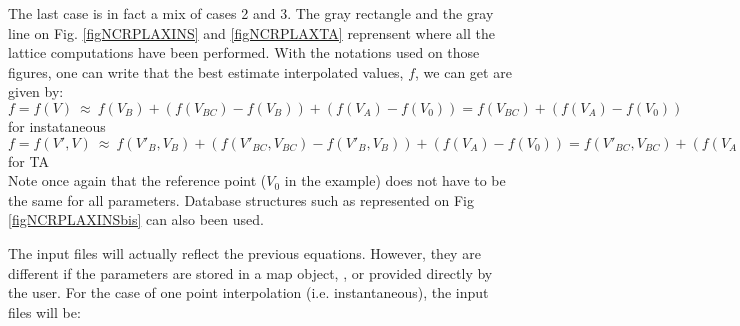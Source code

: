 The last case is in fact a mix of cases 2 and 3. The gray rectangle and the gray line on Fig. \ref{figNCRPLAXINS} and \ref{figNCRPLAXTA} reprensent where all the lattice computations have been performed. With the notations used on those figures, one can write that the best estimate interpolated values, $f$, we can get are given by: \\
$f=f(V)~\approx~f(V_B)+(f(V_{BC})-f(V_B))+(f(V_A)-f(V_0))=f(V_{BC})+(f(V_A)-f(V_0))$ for instataneous\\
$f=f(V',V)~\approx~f(V'_B,V_B)+(f(V'_{BC},V_{BC})-f(V'_B,V_B))+(f(V_A)-f(V_0))=f(V'_{BC},V_{BC})+(f(V_A)-f(V_0))$ for TA\\
Note once again that the reference point ($V_0$ in the example) does not have to be the same for all parameters. Database structures such as represented on Fig \ref{figNCRPLAXINSbis} can also been used.
\clearpage

The input files will actually reflect the previous equations. However, they are different if the parameters are stored in a {\sc map} object, , or provided directly by the user. For the case of one point interpolation (i.e. instantaneous), the input files will be: \\

